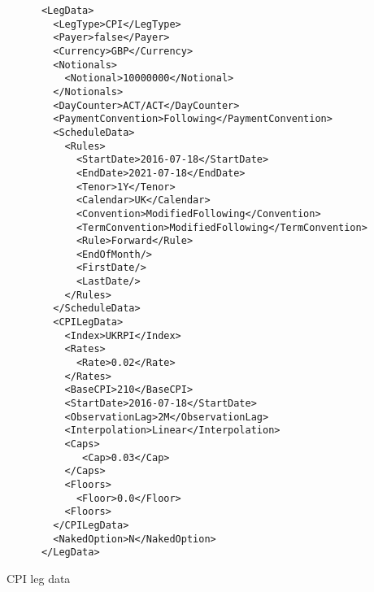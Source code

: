 \begin{listing}[H]
\begin{verbatim}
      <LegData>
        <LegType>CPI</LegType>
        <Payer>false</Payer>
        <Currency>GBP</Currency>
        <Notionals>
          <Notional>10000000</Notional>
        </Notionals>
        <DayCounter>ACT/ACT</DayCounter>
        <PaymentConvention>Following</PaymentConvention>
        <ScheduleData>
          <Rules>
            <StartDate>2016-07-18</StartDate>
            <EndDate>2021-07-18</EndDate>
            <Tenor>1Y</Tenor>
            <Calendar>UK</Calendar>
            <Convention>ModifiedFollowing</Convention>
            <TermConvention>ModifiedFollowing</TermConvention>
            <Rule>Forward</Rule>
            <EndOfMonth/>
            <FirstDate/>
            <LastDate/>
          </Rules>
        </ScheduleData>
        <CPILegData>
          <Index>UKRPI</Index>
          <Rates>
            <Rate>0.02</Rate>
          </Rates>
          <BaseCPI>210</BaseCPI>
          <StartDate>2016-07-18</StartDate>
          <ObservationLag>2M</ObservationLag>
          <Interpolation>Linear</Interpolation>
          <Caps>
             <Cap>0.03</Cap>
          </Caps>
          <Floors>
            <Floor>0.0</Floor>
          <Floors>
        </CPILegData>
        <NakedOption>N</NakedOption>
      </LegData>
\end{verbatim}
\caption{CPI leg data}
\label{lst:cpilegdata}
\end{listing}

